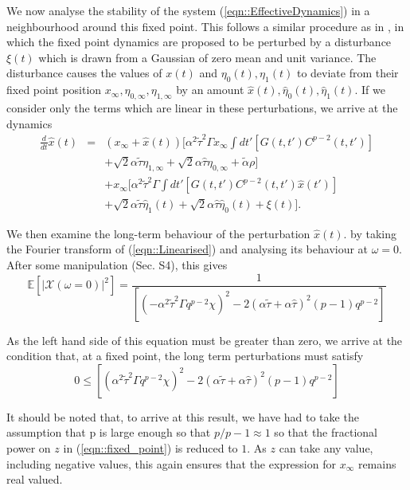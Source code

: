 \documentclass[sigconf,anonymous]{aamas}
\newcommand{\talpha}{\tilde{\alpha}}
\newcommand{\ttau}{\tilde{\tau}}
\newcommand{\htau}{\hat{\tau}}
\newcommand{\xfixed}{x_\infty}
\newcommand{\ezerof}{\eta_{0, \infty}}
\newcommand{\eonef}{\eta_{1, \infty}}
\newcommand{\xpert}{\hat{x}(t)}
\newcommand{\xpertdash}{\hat{x}(t')}
\newcommand{\ezeropert}{\hat{\eta}_0(t)}
\newcommand{\eonepert}{\hat{\eta}_1(t)}
\begin{document}
We now analyse the stability of the system (\ref{eqn::EffectiveDynamics}) in a neighbourhood around
this fixed point. This follows a similar procedure as in \cite{Opper1992}, in
which the fixed point dynamics are proposed to be perturbed by a
disturbance $\xi(t)$ which is drawn from a Gaussian of zero mean and
unit variance. The disturbance causes the values of $x(t)$ and
$\eta_0(t), \eta_1(t)$ to deviate from their fixed point position
$\xfixed, \ezerof, \eonef$ by an amount $\xpert, \ezeropert,
\eonepert$.  If we consider only the terms which are linear in these
perturbations, we arrive at the dynamics
%
\begin{eqnarray}
\frac{d}{dt} \xpert & = & (\xfixed + \xpert) [ \alpha^2 \ttau^2 \Gamma \xfixed \int dt' [ G(t, t')C^{p - 2}(t, t') ] \nonumber \\
  & & + \sqrt{2} \alpha \ttau \eonef + \sqrt{2} \alpha \htau \ezerof + \talpha \rho] \nonumber \\
& &  + \xfixed [\alpha^2 \ttau^2 \Gamma \int dt' [ G(t, t')C^{p - 2}(t, t') \xpertdash ] \nonumber \\
  & & + \sqrt{2} \alpha \ttau \eonepert + \sqrt{2} \alpha \htau \ezeropert + \xi(t)].
\label{eqn::Linearised}
\end{eqnarray}

We then examine the
long-term behaviour of the perturbation $\xpert$. by taking
the Fourier transform of (\ref{eqn::Linearised}) and analysing its
behaviour at $\omega = 0$. After some manipulation (Sec. S4), this gives
%
\begin{equation}
        \mathbb{E}[|\mathcal{X}(\omega = 0)|^2] = \frac{1}{\left[ (-\alpha^2 \ttau^2 \Gamma q^{p-2} \chi)^2 - 2 (\alpha \ttau + \alpha \htau)^2 (p-1)q^{p-2}\right]} 
\end{equation}

As the left hand side of this equation must be greater than zero, we arrive at the condition that, at a fixed point, the long term perturbations must satisfy
%
\begin{equation}
    \label{eqn::Final}
    0 \leq \left [(\alpha^2 \ttau^2 \Gamma q^{p-2} \chi)^{2} - 2 (\alpha \ttau + \alpha \htau)^2 (p-1)q^{p-2} \right ]
\end{equation}

It should be noted that, to arrive at this result, we have had to take the assumption that p is large enough so that $p/p-1 \approx 1$ so that the fractional power on $z$ in (\ref{eqn::fixed_point}) is reduced to $1$. As $z$ can take any value, including negative values, this again ensures that the expression for $\xfixed$ remains real valued.
\end{document}
